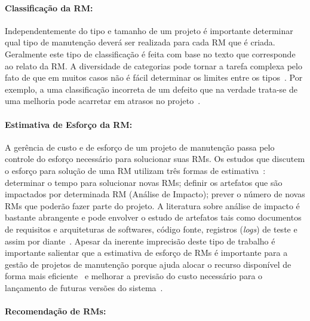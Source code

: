 \paragraph{Classificação da RM:}

Independentemente do tipo e tamanho de um projeto é importante determinar qual
tipo de manutenção deverá ser realizada para cada RM que é criada. Geralmente
este tipo de classificação é feita com base no texto que corresponde ao relato
da RM\@. A diversidade de categorias pode tornar a tarefa complexa pelo fato de
que em muitos casos não é fácil determinar os limites entre os
tipos~\cite{antoniol2008bug}. Por exemplo, a uma classificação incorreta de um
defeito que na verdade trata-se de uma melhoria pode acarretar em atrasos no
projeto~\cite{cavalcanti2014challenges}.

\paragraph{Estimativa de Esforço da RM:}

A gerência de custo e de esforço de um projeto de manutenção passa pelo
controle do esforço necessário para solucionar suas RMs. Os estudos que
discutem o esforço para solução de uma RM utilizam três formas de
estimativa~\cite{cavalcanti2014challenges}: determinar o tempo para solucionar
novas RMs; definir os artefatos que são impactados por determinada RM (Análise
de Impacto); prever o número de novas RMs que poderão fazer parte do projeto. A
literatura sobre análise de impacto é bastante abrangente e pode envolver o
estudo de artefatos tais como documentos de requisitos e arquiteturas de
softwares, código fonte, registros (\textit{logs}) de teste e assim por
diante~\cite{cavalcanti2014challenges}. Apesar da inerente imprecisão deste
tipo de trabalho é importante salientar que a estimativa de esforço de RMs é
importante para a gestão de projetos de manutenção porque ajuda alocar o
recurso disponível de forma mais
eficiente~\cite{Bhattacharya:2011:BTP:1985441.1985472} e melhorar a previsão do
custo necessário para o lançamento de futuras versões do
sistema~\cite{Vijayakumar2014}.

\paragraph{Recomendação de RMs:}

